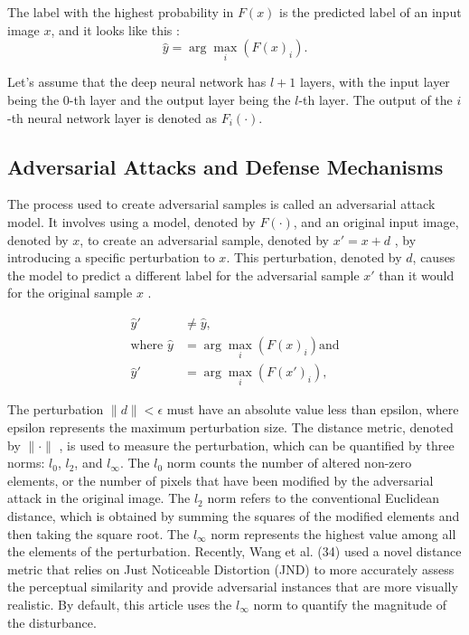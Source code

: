 \documentclass[10pt, conference, a4paper, final]{IEEEtran}
\begin{document}
The label with the highest probability in \( F(x) \) is the predicted label of an input image \( x \), and it looks like this \cite {ZhangS.}: 
\begin{equation}
    \hat{y} = \arg\max_i (F(x)_i).
    \end{equation}

Let's assume that the deep neural network has \( l + 1 \) layers, with the input layer being the 0-th layer and the output layer being the \( l \)-th layer. The output of the \( i \)-th neural network layer is denoted as \( F_i(\cdot) \).

\subsection{Adversarial Attacks and Defense Mechanisms} 

The process used to create adversarial samples is called an adversarial attack model. It involves using a model, denoted by  \( F(\cdot) \), and an original input image, denoted by \( x \), to create an adversarial sample, denoted by \( x' = x + d \) , by introducing a specific perturbation to \( x \). This perturbation, denoted by \( d \), causes the model to predict a different label for the adversarial sample \( x' \) than it would for the original sample \( x \) \cite {ZhangS.}.

\begin{align}
    \hat{y}' &\neq \hat{y}, \\
    \text{where } \hat{y} &= \arg\max_i (F(x)_i) \text{and} \\
    \hat{y}'&= \arg\max_i (F(x')_i),
\end{align}

The perturbation \( \|d\| < \epsilon \) must have an absolute value less than epsilon, where epsilon represents the maximum perturbation size. The distance metric, denoted by  \( \|\cdot\| \) , is used to measure the perturbation, which can be quantified by three norms: \( l_0 \), \( l_2 \), and 
\( l_{\infty} \). The \( l_0 \) norm counts the number of altered non-zero elements, or the number of pixels that have been modified by the adversarial attack in the original image. The \( l_2 \) norm refers to the conventional Euclidean distance, which is obtained by summing the squares of the modified elements and then taking the square root. The \( l_{\infty} \) norm represents the highest value among all the elements of the perturbation. Recently, Wang et al. (34) used a novel distance metric that relies on Just Noticeable Distortion (JND) to more accurately assess the perceptual similarity and provide adversarial instances that are more visually realistic. By default, this article uses the 
\( l_{\infty} \) norm to quantify the magnitude of the disturbance.
\end{document}
